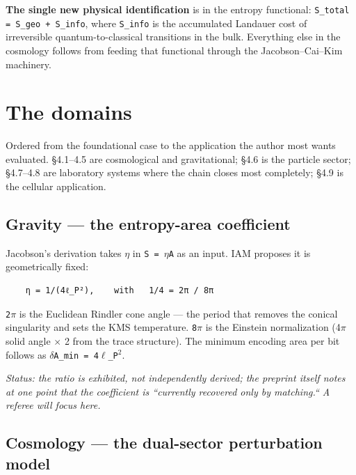 \documentclass[12pt,a4paper]{article}
\begin{document}
\textbf{The single new physical identification} is in the entropy functional: \texttt{S\_total = S\_geo + S\_info}, where \texttt{S\_info} is the accumulated Landauer cost of irreversible quantum-to-classical transitions in the bulk. Everything else in the cosmology follows from feeding that functional through the Jacobson--Cai--Kim machinery.







\section{The domains}

Ordered from the foundational case to the application the author most wants evaluated. \S4.1--4.5 are cosmological and gravitational; \S4.6 is the particle sector; \S4.7--4.8 are laboratory systems where the chain closes most completely; \S4.9 is the cellular application.





\subsection{Gravity --- the entropy-area coefficient}

Jacobson's derivation takes \texttt{$\eta$} in \texttt{S = $\eta$A} as an input. IAM proposes it is geometrically fixed:


\begin{lstlisting}
    η = 1/(4ℓ_P²),    with   1/4 = 2π / 8π
\end{lstlisting}


\texttt{2$\pi$} is the Euclidean Rindler cone angle --- the period that removes the conical singularity and sets the KMS temperature. \texttt{8$\pi$} is the Einstein normalization (4$\pi$ solid angle $\times$ 2 from the trace structure). The minimum encoding area per bit follows as \texttt{$\delta$A\_min = 4$\ell$\_P$^{2}$}.


\textit{Status: the ratio is exhibited, not independently derived; the preprint itself notes at one point that the coefficient is ``currently recovered only by matching.`` A referee will focus here.}





\subsection{Cosmology --- the dual-sector perturbation model}
\end{document}

